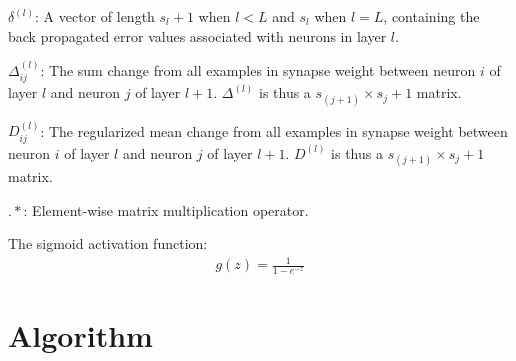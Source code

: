 \documentclass[12pt,notitlepage]{report}
\begin{document}
  $\delta^{(l)}$: A vector of length $s_{l} + 1$ when $l < L$ and $s_{l}$ when
  $l = L$, containing the back propagated error values associated with neurons
  in layer $l$.

  $\Delta_{ij}^{(l)}$: The sum change from all examples in synapse weight
  between neuron $i$ of layer $l$ and neuron $j$ of layer $l+1$.  $\Delta^{(l)}$
  is thus a $s_{(j+1)} \times s_{j}+1$ matrix.

  $D_{ij}^{(l)}$: The regularized mean change from all examples in synapse
  weight between neuron $i$ of layer $l$ and neuron $j$ of layer $l+1$.
  $D^{(l)}$ is thus a $s_{(j+1)} \times s_{j}+1$ matrix.

  $.*$: Element-wise matrix multiplication operator.

  The sigmoid activation function:
  \begin{align}
    g(z) = \frac{1}{1 - e^{-z}}
  \end{align}

  \section{Algorithm}
\end{document}
